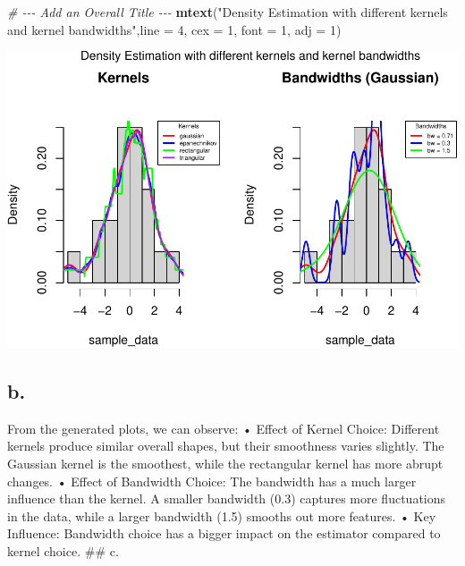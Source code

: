 \documentclass[
]{article}
\newenvironment{Shaded}{\begin{snugshade}}{\end{snugshade}}
\newcommand{\AttributeTok}[1]{\textcolor[rgb]{0.13,0.29,0.53}{#1}}
\newcommand{\CommentTok}[1]{\textcolor[rgb]{0.56,0.35,0.01}{\textit{#1}}}
\newcommand{\DecValTok}[1]{\textcolor[rgb]{0.00,0.00,0.81}{#1}}
\newcommand{\FunctionTok}[1]{\textcolor[rgb]{0.13,0.29,0.53}{\textbf{#1}}}
\newcommand{\NormalTok}[1]{#1}
\newcommand{\StringTok}[1]{\textcolor[rgb]{0.31,0.60,0.02}{#1}}
\begin{document}
\begin{Shaded}
\begin{Highlighting}[]
\CommentTok{\# {-}{-}{-} Add an Overall Title {-}{-}{-}}
\FunctionTok{mtext}\NormalTok{(}\StringTok{"Density Estimation with different kernels and kernel bandwidths"}\NormalTok{,}\AttributeTok{line =} \DecValTok{4}\NormalTok{, }\AttributeTok{cex =} \DecValTok{1}\NormalTok{, }\AttributeTok{font =} \DecValTok{1}\NormalTok{, }\AttributeTok{adj =} \DecValTok{1}\NormalTok{)}
\end{Highlighting}
\end{Shaded}

\includegraphics{SDA_submission_template_files/figure-latex/unnamed-chunk-1-1.pdf}

\subsection{b.}\label{b.}

From the generated plots, we can observe: • Effect of Kernel Choice:
Different kernels produce similar overall shapes, but their smoothness
varies slightly. The Gaussian kernel is the smoothest, while the
rectangular kernel has more abrupt changes. • Effect of Bandwidth
Choice: The bandwidth has a much larger influence than the kernel. A
smaller bandwidth (0.3) captures more fluctuations in the data, while a
larger bandwidth (1.5) smooths out more features. • Key Influence:
Bandwidth choice has a bigger impact on the estimator compared to kernel
choice. \#\# c.
\end{document}
